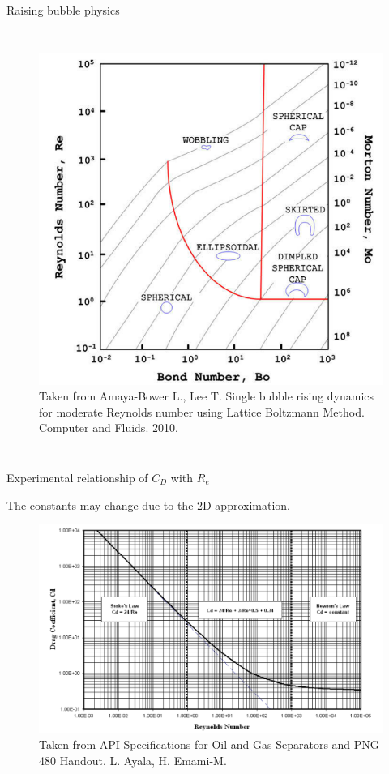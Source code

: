 \documentclass[8pt]{beamer}
\begin{document}
\begin{frame}{Raising bubble physics}
\begin{columns}[T]
			\begin{figure}
				\centering
				\includegraphics[scale=0.2]{pics/shapeRegimes.png}
				\\{\tiny \justifying Taken from Amaya-Bower L., Lee T. Single bubble rising dynamics for moderate Reynolds number using Lattice Boltzmann Method. Computer and Fluids. 2010.}
			\end{figure}
			
		\end{columns}
		
	\end{frame}

	\begin{frame}{Experimental relationship of $C_D$ with $R_e$}
		
		The constants may change due to the 2D approximation. 
		\begin{figure}
			\centering
			\includegraphics[scale=0.2]{pics/dragRe.png}
			\\{\tiny \justifying Taken from API Specifications for Oil and Gas Separators and PNG 480 Handout. L. Ayala, H. Emami-M. }
		\end{figure}
	\end{frame}
	
\end{document}
